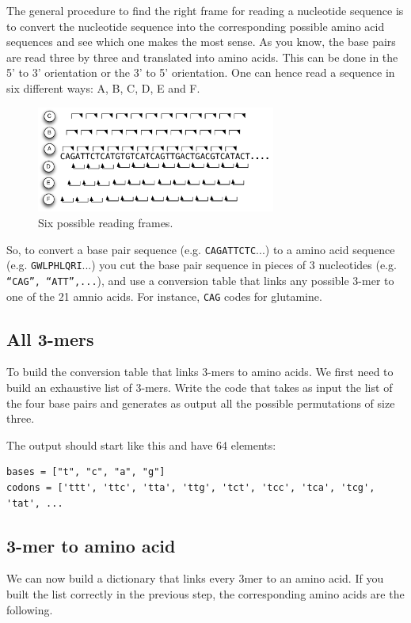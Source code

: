 \documentclass[a4paper,11pt]{article}
\begin{document}
The general procedure to find the right frame for reading a nucleotide sequence is to convert the nucleotide sequence into the corresponding possible amino acid sequences and see which one makes the most sense. As you know, the base pairs are read three by three and translated into amino acids. This can be done in the 5' to 3' orientation or the 3' to 5' orientation. One can hence read a sequence in six different ways: A, B, C, D, E and F.

\begin{figure}[ht!]
	\centering
	\includegraphics[width=0.7\textwidth]{reading_frame.pdf}
	\caption{Six possible reading frames.}
	\label{fig:gene_distribution_rib}
\end{figure}

So, to convert a base pair sequence (e.g. \texttt{CAGATTCTC}...) to a amino acid sequence (e.g. \texttt{GWLPHLQRI}...) you cut the base pair sequence in pieces of 3 nucleotides (e.g. \texttt{``CAG'', ``ATT'',...}), and use a conversion table that links any possible 3-mer to one of the 21 amnio acids. For instance, \texttt{CAG} codes for glutamine.

\subsection{All 3-mers}
To build the conversion table that links 3-mers to amino acids. We first need to build an exhaustive list of 3-mers. Write the code that takes as input the list of the four base pairs and generates as output all the possible permutations of size three.
	
The output should start like this and have 64 elements:
	
\begin{verbatim}
bases = ["t", "c", "a", "g"]
codons = ['ttt', 'ttc', 'tta', 'ttg', 'tct', 'tcc', 'tca', 'tcg', 'tat', ...
\end{verbatim}

\subsection{3-mer to amino acid}
We can now build a dictionary that links every 3mer to an amino acid. If you built the list correctly in the previous step, the corresponding amino acids are the following.
\end{document}
